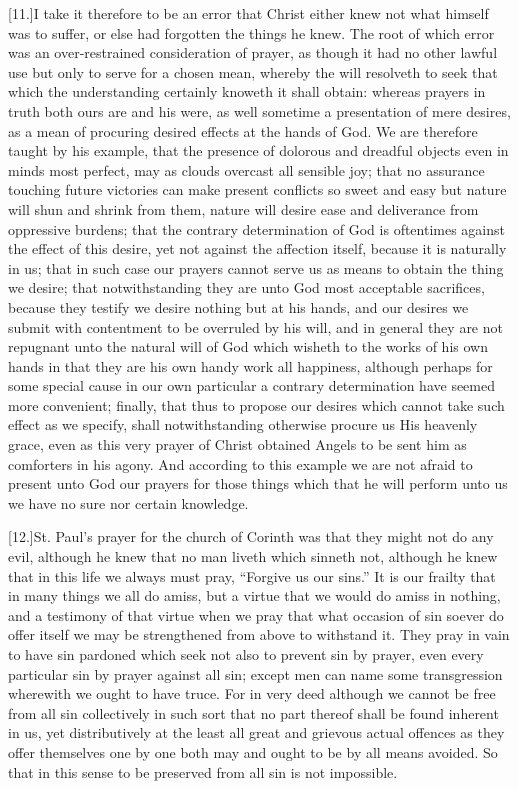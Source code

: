 [11.]I take it therefore to be an error that Christ either knew not what himself was to suffer, or else had forgotten the things he knew. The root of which error was an over-restrained consideration of prayer, as though it had no other lawful use but only to serve for a chosen mean, whereby the will resolveth to seek that which the understanding certainly knoweth it shall obtain: whereas prayers in truth both ours are and his were, as well sometime a presentation of mere desires, as a mean of procuring desired effects at the hands of God. We are therefore taught by his example, that the presence of dolorous and dreadful objects even in minds most perfect, may as clouds overcast all sensible joy; that no  assurance touching future victories can make present conflicts so sweet and easy but nature will shun and shrink from them,
 nature will desire ease and deliverance from oppressive burdens; that the contrary determination of God is oftentimes against the effect of this desire, yet not against the affection itself, because it is naturally in us; that in such case our prayers cannot serve us as means to obtain the thing we desire; that notwithstanding they are unto God most acceptable sacrifices, because they testify we desire nothing but at his hands, and our desires we submit with contentment to be overruled by his will, and in general they are not repugnant unto the natural will of God which wisheth to the works of his own hands in that they are his own handy work all happiness, although perhaps for some special cause in our own particular a contrary determination have seemed more convenient; finally, that thus to propose our desires which cannot take such effect as we specify, shall notwithstanding otherwise procure us His heavenly grace, even as this very prayer of Christ obtained Angels to be sent him as comforters in his agony. And according to this example we are not afraid to present unto God our prayers for those things which that he will perform unto us we have no sure nor certain knowledge.

[12.]St. Paul’s prayer for the church of Corinth was that they might not do any evil, although he knew that no man liveth which sinneth not, although he knew that in this life we always must pray, “Forgive us our sins.” It is our frailty that in many things we all do amiss, but a virtue that we would do amiss in nothing, and a testimony of that virtue when we pray that what occasion of sin soever do offer itself we may be strengthened from above to withstand it. They pray in vain to have sin pardoned which seek not also to prevent sin by prayer, even every particular sin by prayer against all sin; except men can name some transgression wherewith we ought to have truce. For in very deed although we cannot be free from all sin collectively in such sort that no part thereof shall be found inherent in us, yet distributively at the least all great and grievous actual offences as they offer themselves  one by one both may and ought to be by all means avoided. So that in this sense to be preserved from all sin is not impossible.


